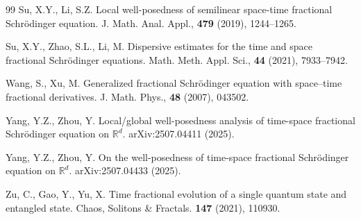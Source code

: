 \documentclass[reqno]{amsart}
\numberwithin{equation}{section}
\begin{document}
\begin{thebibliography}{99}
Su, X.Y., Li, S.Z. Local well-posedness of semilinear space-time fractional Schrödinger
equation. J. Math. Anal. Appl., \textbf{479} (2019), 1244–1265.

Su, X.Y., Zhao, S.L., Li, M. Dispersive estimates for the time and space fractional Schrödinger equations. Math. Meth. Appl. Sci., \textbf{44} (2021), 7933–7942.

Wang, S., Xu, M. Generalized fractional Schrödinger equation with space–time fractional derivatives. J. Math. Phys., \textbf{48} (2007), 043502.

Yang, Y.Z., Zhou, Y. Local/global well-posedness analysis of time-space fractional Schrödinger equation on $\mathbb{R}^{d}$. arXiv:2507.04411 (2025).

Yang, Y.Z., Zhou, Y. On the well-posedness of time-space fractional Schrödinger equation on $\mathbb{R}^{d}$. arXiv:2507.04433 (2025).

Zu, C., Gao, Y., Yu, X. Time fractional evolution of a single quantum state and entangled state. Chaos, Solitons \& Fractals. \textbf{147} (2021), 110930.

\end{thebibliography}
\end{document}
